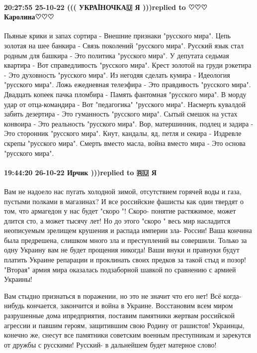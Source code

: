 \paragraph{20:27:55 25-10-22 ((( УКРАЇНОЧКА🇺 Я )))replied to ♡♡♡ Каролина♡♡♡}

Пьяные крики и запах сортира -
Внешние признаки "русского мира".
Цепь золотая на шее банкира -
Связь поколений "русского мира".
Русский язык стал родным для башкира -
Это политика "русского мира".
У депутата седьмая квартира -
Вот справедливость "русского мира".
Крест золотой на груди рэкетира -
Это духовность "русского мира".
Из негодяя сделать кумира -
Идеология "русского мира".
Ложь ежедневная телеэфира -
Это правдивость "русского мира".
Двадцать копеек пачка пломбира -
Память фантомная "русского мира".
В морду удар от отца-командира -
Вот "педагогика" "русского мира".
Насмерть кувалдой забить дезертира -
Это гуманность "русского мира".
Сытый смешок на устах конвоира -
Это реальность "русского мира".
Вор, матершинник, подлец и задира -
Это сторонник "русского мира".
Кнут, кандалы, яд, петля и секира -
Издревле скрепы "русского мира".
Смерть вместо масла, война вместо мира -
Это основа "русского мира".

\paragraph{19:44:20 26-10-22 Ирчик )))replied to 🇷🇺 Я}

Вам не надоело нас пугать холодной зимой, отсутствием горячей воды и газа,
пустыми полками в магазинах? И все российские фашисты как один твердят о том,
что армагедон у нас будет "скоро "! Скоро- понятие растяжимое, может длится
сто, а может тысячу лет! Но до этого "скоро " весь мир насладится неописуемым
зрелищем крушения и распада империи зла- России! Ваша кончина была предрешена,
слишком много зла и преступлений вы совершили. Только за одну Украину вам не
будет прощения никогда! Ваши внуки и правнуки будут платить Украине репарации и
проклинать своих предков за такой стыд и позор! "Вторая" армия мира оказалась
подзаборной шавкой по сравнению с армией Украины!

Вам стыдно признаться в поражении, но это не значит что его нет! Всё
когда-нибудь кончается, закончится и война в Украине. Восстановим всем миром
разрушенные дома ипредприятия, поставим памятники жертвам российской агрессии и
павшим героям, защитившим свою Родину от рашистов! Украинцы, конечно же, снесут
все памятники советским военным преступникам и зарекутся от дружбы с русскими!
Русский- в дальнейшем будет матерное слово!
